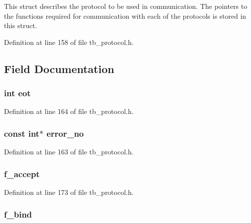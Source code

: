This struct describes the protocol to be used in communication. The pointers to the functions required for communication with each of the protocols is stored in this struct. 

Definition at line 158 of file tb\-\_\-protocol.\-h.



\subsection{Field Documentation}
\hypertarget{structtb__protocol__t_aba5b95ee17dc696379f1f4bc387cb075}{
\subsubsection[{eot}]{\setlength{\rightskip}{0pt plus 5cm}int eot}}\label{structtb__protocol__t_aba5b95ee17dc696379f1f4bc387cb075}


Definition at line 164 of file tb\-\_\-protocol.\-h.

\hypertarget{structtb__protocol__t_a154801a8a2d2211e5294ebaafb7ab904}{
\subsubsection[{error\-\_\-no}]{\setlength{\rightskip}{0pt plus 5cm}const int$\ast$ error\-\_\-no}}\label{structtb__protocol__t_a154801a8a2d2211e5294ebaafb7ab904}


Definition at line 163 of file tb\-\_\-protocol.\-h.

\hypertarget{structtb__protocol__t_a2fc85e4eab79ec0b85f8b1b599919b63}{
\subsubsection[{f\-\_\-accept}]{ f\-\_\-accept}}\label{structtb__protocol__t_a2fc85e4eab79ec0b85f8b1b599919b63}


Definition at line 173 of file tb\-\_\-protocol.\-h.

\hypertarget{structtb__protocol__t_a7e09c5e8d544ff3b707da30e813725a4}{
\subsubsection[{f\-\_\-bind}]{ f\-\_\-bind}}\label{structtb__protocol__t_a7e09c5e8d544ff3b707da30e813725a4}


